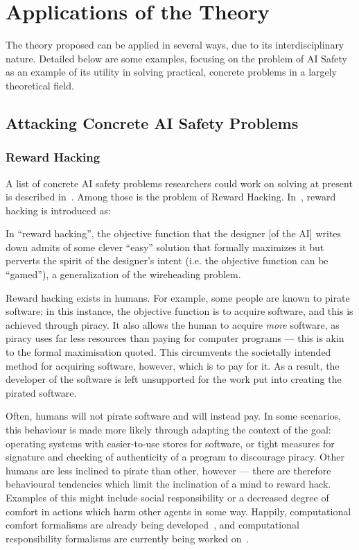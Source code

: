 \section{Applications of the Theory}
The theory proposed can be applied in several ways, due to its interdisciplinary nature. Detailed below are some examples, focusing on the problem of AI Safety as an example of its utility in solving practical, concrete problems in a largely theoretical field.\par

\subsection{Attacking Concrete AI Safety Problems}

\subsubsection{Reward Hacking}
A list of concrete AI safety problems researchers could work on solving at present is described in~\cite{concrete_problems}. Among those is the problem of Reward Hacking. In~\cite{concrete_problems}, reward hacking is introduced as:

\begin{displayquote}
In ``reward hacking'', the objective function that the designer [of the AI] writes down admits of some clever ``easy'' solution that formally maximizes it but perverts the spirit of the designer’s intent (i.e. the objective function can be ``gamed''), a generalization of the wireheading problem.
\end{displayquote}

Reward hacking exists in humans. For example, some people are known to pirate software: in this instance, the objective function is to acquire software, and this is achieved through piracy. It also allows the human to acquire \emph{more} software, as piracy uses far less resources than paying for computer programs --- this is akin to the formal maximisation quoted. This circumvents the societally intended method for acquiring software, however, which is to pay for it. As a result, the developer of the software is left unsupported for the work put into creating the pirated software.\par

Often, humans will not pirate software and will instead pay. In some scenarios, this behaviour is made more likely through adapting the context of the goal: operating systems with easier-to-use stores for software, or tight measures for signature and checking of authenticity of a program to discourage piracy. Other humans are less inclined to pirate than other, however --- there are therefore behavioural tendencies which limit the inclination of a mind to reward hack. Examples of this might include social responsibility or a decreased degree of comfort in actions which harm other agents in some way. Happily, computational comfort formalisms are already being developed~\citep{Marsh2011}, and computational responsibility formalisms are currently being worked on~\cite{wallis_responsibility}.\par

